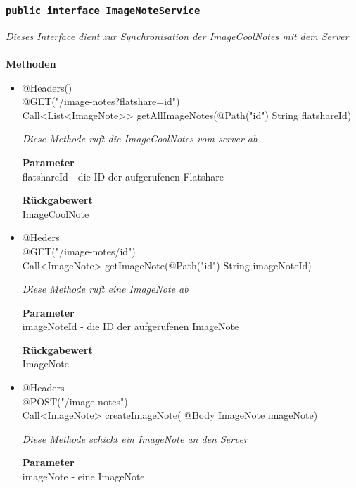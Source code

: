              
             	\subsubsection{\texttt{public interface ImageNoteService }}
        \textit{Dieses Interface dient zur Synchronisation der ImageCoolNotes mit dem Server}\\
        \\
		\textbf{Methoden} \\
 			\begin{itemize}
        		\item{@Headers()\\ @GET("/image-notes?flatshare={id}")\\
   Call<List<ImageNote>> getAllImageNotes(@Path("id") String flatshareId)}
        	
        		\textit{Diese Methode ruft die ImageCoolNotes vom server ab}
        	
        		\textbf{Parameter} \\
                flatshareId - die ID der aufgerufenen Flatshare   
        		        	
       		 	\textbf{Rückgabewert} \\
                ImageCoolNote
      		  	 
      	      \item{@Heders\\ @GET("/image-notes/{id}")\\ Call<ImageNote> getImageNote(@Path("id") String imageNoteId)}
        	
      	 	 	\textit{Diese Methode ruft eine ImageNote ab }
        	
        		\textbf{Parameter} \\
        		 imageNoteId - die ID der aufgerufenen ImageNote  
        	
        		\textbf{Rückgabewert} \\
                ImageNote
                
                \item{@Headers\\ @POST("/image-notes")\\ Call<ImageNote> createImageNote( @Body ImageNote imageNote)}
        	
      	 	 	\textit{Diese Methode schickt ein ImageNote an den Server}
        	
        		\textbf{Parameter} \\
        		 imageNote - eine ImageNote  
        	

\end{itemize}
